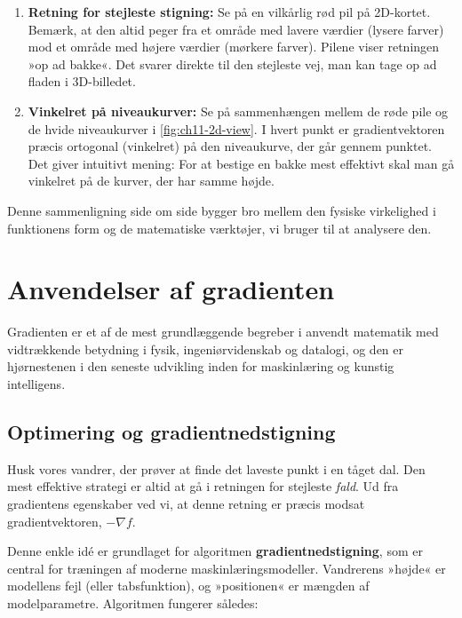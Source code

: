 \begin{enumerate}
    \item \textbf{Retning for stejleste stigning:} Se på en vilkårlig rød pil på 2D-kortet. Bemærk, at den altid peger fra et område med lavere værdier (lysere farver) mod et område med højere værdier (mørkere farver). Pilene viser retningen »op ad bakke«. Det svarer direkte til den stejleste vej, man kan tage op ad fladen i 3D-billedet.
    
    \item \textbf{Vinkelret på niveaukurver:} Se på sammenhængen mellem de røde pile og de hvide niveaukurver i \autoref{fig:ch11-2d-view}. I hvert punkt er gradientvektoren præcis ortogonal (vinkelret) på den niveaukurve, der går gennem punktet. Det giver intuitivt mening: For at bestige en bakke mest effektivt skal man gå vinkelret på de kurver, der har samme højde.
\end{enumerate}

Denne sammenligning side om side bygger bro mellem den fysiske virkelighed i funktionens form og de matematiske værktøjer, vi bruger til at analysere den.

\section{Anvendelser af gradienten}

Gradienten er et af de mest grundlæggende begreber i anvendt matematik med vidtrækkende betydning i fysik, ingeniørvidenskab og datalogi, og den er hjørnestenen i den seneste udvikling inden for maskinlæring og kunstig intelligens.

\subsection*{Optimering og gradientnedstigning}
Husk vores vandrer, der prøver at finde det laveste punkt i en tåget dal. Den mest effektive strategi er altid at gå i retningen for stejleste \emph{fald}. Ud fra gradientens egenskaber ved vi, at denne retning er præcis modsat gradientvektoren, \( -\nabla f \).

Denne enkle idé er grundlaget for algoritmen \textbf{gradientnedstigning}, som er central for træningen af moderne maskinlæringsmodeller. Vandrerens »højde« er modellens fejl (eller tabsfunktion), og »positionen« er mængden af modelparametre. Algoritmen fungerer således:

\vspace{1cm}

